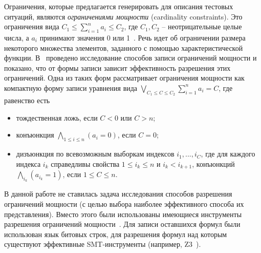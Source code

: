 Ограничения, которые предлагается генерировать для описания тестовых ситуаций,
являются \emph{ограничениями мощности} (cardinality constraints). Это
ограничения вида $C_1 \leqslant \sum_{i=1}^n a_i \leqslant C_2$, где $C_1, C_2$
-- неотрицательные целые числа, а $a_i$ принимают значения 0 или
1~\cite{smt_debugging, PiskacK08, KuncakR07,
Revesz05}. Речь идет об ограничении размера некоторого множества
элементов, заданного с помощью характеристической функции.
В~\cite{smt_debugging} проведено исследование способов записи
ограничений мощности и показано, что от формы записи зависит
эффективность разрешения этих ограничений. Одна из таких форм рассматривает ограничения
мощности как компактную форму записи уравнения
вида $\bigvee_{C_1 \leqslant C \leqslant C_2} \sum_{i=1}^n a_i = C$,
где равенство есть
\begin{itemize}
\item тождественная ложь, если $C < 0$ или $C > n$;
\item конъюнкция $\bigwedge_{1\leqslant i\leqslant n} (a_i = 0)$,
если $C = 0$;
\item дизъюнкция по всевозможным выборкам индексов $i_1, ..., i_C$, где
для каждого индекса $i_k$ справедливы свойства $1 \leqslant i_k
\leqslant n$ и $i_k < i_{k+1}$, конъюнкций $\bigwedge_{i_k} (a_{i_k}
= 1)$, если $1 \leqslant C \leqslant n$.
\end{itemize}

В данной работе не ставилась задача исследования способов разрешения ограничений
мощности (с целью выбора наиболее эффективного способа их представления). Вместо
этого были использованы
имеющиеся инструменты разрешения ограничений мощности~\cite{Z3, Yices}. Для
записи оставшихся формул были использован язык битовых строк, для разрешения
формул над которым существуют эффективные SMT-инструменты (например,
Z3~\cite{Z3}).

